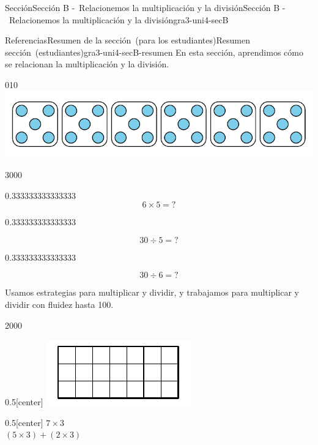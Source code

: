\documentclass[oneside,10pt,]{article}
\begin{document}
\begin{sectionptx}{Sección}{Sección B -~Relacionemos la multiplicación y la división}{}{Sección B -~Relacionemos la multiplicación y la división}{}{}{gra3-uni4-secB}
%
\begin{references-subsection}{Referencias}{Resumen de la sección~(para los estudiantes)}{}{Resumen sección~(estudiantes)}{}{}{gra3-uni4-secB-resumen}
En esta sección, aprendimos cómo se relacionan la multiplicación y la división.%
\begin{image}{0}{1}{0}{}%
\includegraphics[width=\linewidth]{external/svg-source/tikz-file-176322.pdf}
\end{image}%
\begin{sidebyside}{3}{0}{0}{0}%
\begin{sbspanel}{0.333333333333333}%
%
\begin{equation*}
6\times 5={?}
\end{equation*}
%
\end{sbspanel}%
\begin{sbspanel}{0.333333333333333}%
\par
%
\begin{equation*}
30\div 5={?}
\end{equation*}
%
\end{sbspanel}%
\begin{sbspanel}{0.333333333333333}%
\par
%
\begin{equation*}
30\div 6={?}
\end{equation*}
%
\end{sbspanel}%
\end{sidebyside}%
\par
Usamos estrategias para multiplicar y dividir, y trabajamos para multiplicar y dividir con fluidez hasta 100.%
\begin{sidebyside}{2}{0}{0}{0}%
\begin{sbspanel}{0.5}[center]%
\includegraphics[width=\linewidth]{external/svg-source/tikz-file-141807.pdf}
\end{sbspanel}%
\begin{sbspanel}{0.5}[center]%
\(7\times 3\)\\
 \((5\times3)+(2\times3)\)%
\end{sbspanel}%
\end{sidebyside}%
\end{references-subsection}
\end{sectionptx}
\end{document}
